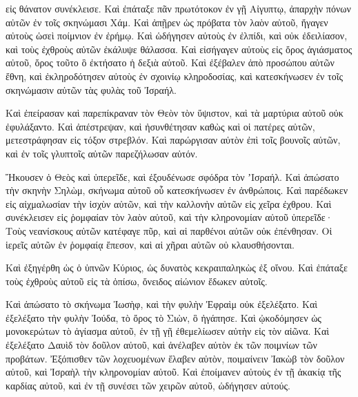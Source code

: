 {εἰς θάνατον συνέκλεισε. Καὶ ἐπάταξε πᾶν πρωτότοκον ἐν γῇ Αἰγυπτῳ, ἀπαρχὴν πόνων αὐτῶν ἐν τοῖς σκηνώμασι Χάμ.
Καὶ ἀπῇρεν ὡς πρόβατα τὸν λαὸν αὐτοῦ, ἤγαγεν αὐτοὺς ὡσεὶ
ποίμνιον ἐν ἐρήμῳ. Καὶ ὡδήγησεν αὐτοὺς ἐν ἐλπίδι, καὶ οὐκ ἐδειλίασον, καὶ τοὺς ἐχθροὺς αὐτῶν ἐκάλυψε θάλασσα.
Καὶ εἰσήγαγεν αὐτοὺς εἰς ὄρος ἁγιάσματος αὐτοῦ, ὄρος τοῦτο ὃ
ἐκτήσατο ἡ δεξιὰ αὐτοῦ. Καὶ ἐξέβαλεν ἀπὸ προσώπου αὐτῶν ἔθνη, καὶ ἐκληροδότησεν αὐτοὺς ἐν σχοινίῳ κληροδοσίας, καὶ κατεσκήνωσεν ἐν τοῖς σκηνώμασιν αὐτῶν τὰς φυλὰς τοῦ Ἰσραήλ.
\par }{\PP {}Καὶ ἐπείρασαν καὶ παρεπίκραναν τὸν Θεὸν τὸν ὕψιστον, καὶ τὰ μαρτύρια αὐτοῦ οὐκ ἐφυλάξαντο.
Καὶ ἀπέστρεψαν, καὶ ἠσυνθέτησαν καθὼς καὶ οἱ πατέρες αὐτῶν, μετεστράφησαν εἰς τόξον στρεβλόν.
Καὶ παρώργισαν αὐτὸν ἐπὶ τοῖς βουνοῖς αὐτῶν, καὶ ἐν τοῖς γλυπτοῖς αὐτῶν παρεζήλωσαν αὐτόν.
\par }{\PP {}Ἤκουσεν ὁ Θεὸς καὶ ὑπερεῖδε, καὶ ἐξουδένωσε σφόδρα τὸν
ʼΙσραήλ. Καὶ ἀπώσατο τὴν σκηνὴν Σηλὼμ, σκήνωμα αὐτοῦ
οὗ κατεσκήνωσεν ἐν ἀνθρώποις. Καὶ παρέδωκεν εἰς αἰχμαλωσίαν τὴν ἰσχὺν αὐτῶν, καὶ τὴν καλλονὴν αὐτῶν εἰς χεῖρα
ἐχθρου. Καὶ συνέκλεισεν εἰς ῥομφαίαν τὸν λαὸν αὐτοῦ, καὶ τὴν κληρονομίαν αὐτοῦ ὑπερεῖδε·
Τοὺς νεανίσκους αὐτῶν κατέφαγε πῦρ, καὶ αἱ παρθένοι αὐτῶν οὐκ ἐπένθησαν. Οἱ
ἱερεῖς αὐτῶν ἐν ῥομφαίᾳ ἔπεσον, καὶ αἱ χῆραι αὐτῶν οὐ κλαυσθήσονται.
\par }{\PP {}Καὶ ἐξηγέρθη ὡς ὁ ὑπνῶν Κύριος, ὡς δυνατὸς κεκραιπαληκὼς
ἐξ οἴνου. Καὶ ἐπάταξε τοὺς ἐχθροὺς αὐτοῦ εἰς τὰ ὀπίσω, ὄνειδος αἰώνιον ἔδωκεν αὐτοῖς.
\par }{\PP {}Καὶ ἀπώσατο τὸ σκήνωμα Ἰωσὴφ, καὶ τὴν φυλὴν Ἐφραὶμ
οὐκ ἐξελέξατο. Καὶ ἐξελέξατο τὴν φυλὴν Ἰούδα, τὸ ὄρος τὸ
Σιὼν, ὃ ἠγάπησε. Καὶ ᾠκοδόμησεν ὡς μονοκερώτων τὸ ἁγίασμα αὐτοῦ, ἐν τῇ γῇ ἐθεμελίωσεν αὐτὴν εἰς τὸν αἰῶνα.
Καὶ ἐξελέξατο Δαυὶδ τὸν δοῦλον αὐτοῦ, καὶ ἀνέλαβεν αὐτὸν ἐκ τῶν
ποιμνίων τῶν προβάτων. Ἐξόπισθεν τῶν λοχευομένων ἔλαβεν αὐτὸν, ποιμαίνειν Ἰακὼβ τὸν δοῦλον αὐτοῦ, καὶ Ἰσραὴλ τὴν
κληρονομίαν αὐτοῦ. Καὶ ἐποίμανεν αὐτοὺς ἐν τῇ ἀκακίᾳ τῆς καρδίας αὐτοῦ, καὶ ἐν τῇ συνέσει τῶν χειρῶν αὐτοῦ, ὡδήγησεν αὐτούς.

}
